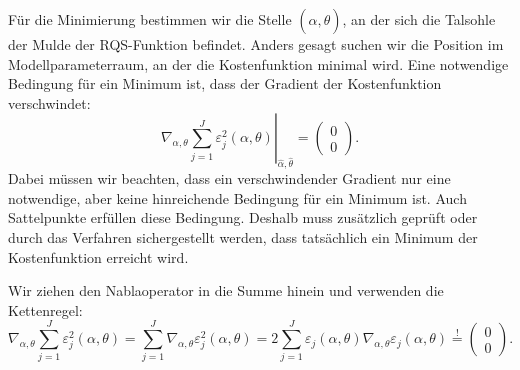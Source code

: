 Für die Minimierung bestimmen wir die Stelle $(\hat\alpha,\hat\theta)$, an der sich die
Talsohle der Mulde der RQS-Funktion befindet. Anders gesagt suchen wir die Position im
Modellparameterraum, an der die Kostenfunktion minimal wird. Eine notwendige Bedingung für ein
Minimum ist, dass der Gradient der Kostenfunktion verschwindet:
\begin{equation}
\left.
\nabla_{\alpha,\theta}
\sum_{j=1}^{J} \varepsilon_j^2(\alpha,\theta)
\right|_{\hat\alpha,\hat\theta}
=
\left(\begin{array}{c}
0 \\
0
\end{array}\right).
\label{LSschaetzung1}
\end{equation}
Dabei müssen wir beachten, dass ein verschwindender Gradient nur eine notwendige, aber keine
hinreichende Bedingung für ein Minimum ist. Auch Sattelpunkte erfüllen diese Bedingung. Deshalb
muss zusätzlich geprüft oder durch das Verfahren sichergestellt werden, dass tatsächlich ein
Minimum der Kostenfunktion erreicht wird.

Wir ziehen den Nablaoperator in die Summe hinein und verwenden die Kettenregel:
\begin{equation}
\nabla_{\alpha,\theta}
\sum_{j=1}^{J} \varepsilon_j^2(\alpha,\theta)
=
\sum_{j=1}^{J}
\nabla_{\alpha,\theta} \varepsilon_j^2(\alpha,\theta)
=
2 \sum_{j=1}^{J}
\varepsilon_j(\alpha,\theta)
\nabla_{\alpha,\theta} \varepsilon_j(\alpha,\theta)
\overset{!}{=}
\left(\begin{array}{c}
0 \\
0
\end{array}\right).
\label{GradientQ2params}
\end{equation}

